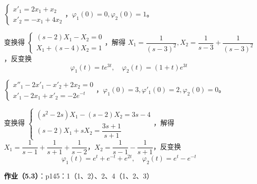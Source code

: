 \begin{example}
$\begin{cases} x'_1 = 2x_1 + x_2 \\ x'_2 = -x_1 + 4x_2 \end{cases}$，$\varphi_1(0) = 0, \varphi_2(0) = 1$。
\end{example}

\begin{solution}
变换得 $\begin{cases} (s-2)X_1 - X_2 = 0 \\ X_1 + (s-4)X_2 = 1 \end{cases}$，解得 $X_1 = \dfrac{1}{(s-3)^2}, X_2 = \dfrac{1}{s-3} + \dfrac{1}{(s-3)^2}$，反变换
$$\varphi_1(t) = te^{3t}, \quad \varphi_2(t) = (1+t)e^{3t}$$
\end{solution}

\begin{example}
$\begin{cases} x''_1 - 2x'_1 - x'_2 + 2x_2 = 0 \\ x'_1 - 2x_1 + x'_2 = -2e^{-t} \end{cases}$，$\varphi_1(0) = 3, \varphi'_1(0) = 2, \varphi_2(0) = 0$。
\end{example}

\begin{solution}
变换得 $\begin{cases} (s^2-2s)X_1 - (s-2)X_2 = 3s - 4 \\ (s-2)X_1 + sX_2 = \dfrac{3s+1}{s+1} \end{cases}$，解得 $X_1 = \dfrac{1}{s-1} + \dfrac{1}{s+1} + \dfrac{1}{s-2}$，$X_2 = \dfrac{1}{s-1} - \dfrac{1}{s+1}$，反变换
$$\varphi_1(t) = e^t + e^{-t} + e^{2t}, \quad \varphi_2(t) = e^t - e^{-t}$$
\end{solution}

\textbf{作业（5.3）}：p145：1（1、2）、2、4（1、2、3）
